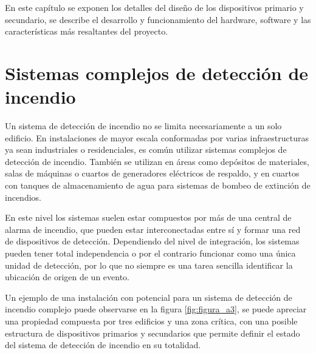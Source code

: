 
En este capítulo se exponen los detalles del diseño de los dispositivos primario y secundario, se describe el desarrollo y funcionamiento del hardware, software y las características más resaltantes del proyecto.

\section{Sistemas complejos de detección de incendio}

Un sistema de detección de incendio no se limita necesariamente a un solo edificio. En instalaciones de mayor escala conformadas por varias infraestructuras ya sean industriales o residenciales, es común utilizar sistemas complejos de detección de incendio. También se utilizan en áreas como depósitos de materiales, salas de máquinas o cuartos de generadores eléctricos de respaldo, y en cuartos con tanques de almacenamiento de agua para sistemas de bombeo de extinción de incendios.

En este nivel los sistemas suelen estar compuestos por más de una central de alarma de incendio, que pueden estar interconectadas entre sí y formar una red de dispositivos de detección. Dependiendo del nivel de integración, los sistemas pueden tener total independencia o por el contrario funcionar como una única unidad de detección, por lo que  no siempre es una tarea sencilla identificar la ubicación de origen de un evento.

Un ejemplo de una instalación con potencial para un sistema de detección de incendio complejo puede observarse en la figura \ref{fig:figura_a3}, se puede apreciar una propiedad compuesta por tres edificios y una zona crítica, con una posible estructura de dispositivos primarios y secundarios que permite definir el estado del sistema de detección de incendio en su totalidad.


